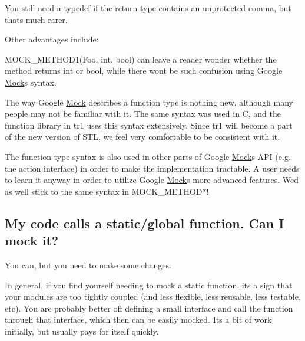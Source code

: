 You still need a {\ttfamily typedef} if the return type contains an unprotected comma, but that\textquotesingle{}s much rarer.

Other advantages include\+:
\begin{DoxyEnumerate}
\item {\ttfamily M\+O\+C\+K\+\_\+\+M\+E\+T\+H\+O\+D1(\+Foo, int, bool)} can leave a reader wonder whether the method returns {\ttfamily int} or {\ttfamily bool}, while there won\textquotesingle{}t be such confusion using Google \hyperlink{class_mock}{Mock}\textquotesingle{}s syntax.
\end{DoxyEnumerate}
\begin{DoxyEnumerate}
\item The way Google \hyperlink{class_mock}{Mock} describes a function type is nothing new, although many people may not be familiar with it. The same syntax was used in C, and the {\ttfamily function} library in {\ttfamily tr1} uses this syntax extensively. Since {\ttfamily tr1} will become a part of the new version of S\+TL, we feel very comfortable to be consistent with it.
\end{DoxyEnumerate}
\begin{DoxyEnumerate}
\item The function type syntax is also used in other parts of Google \hyperlink{class_mock}{Mock}\textquotesingle{}s A\+PI (e.\+g. the action interface) in order to make the implementation tractable. A user needs to learn it anyway in order to utilize Google \hyperlink{class_mock}{Mock}\textquotesingle{}s more advanced features. We\textquotesingle{}d as well stick to the same syntax in {\ttfamily M\+O\+C\+K\+\_\+\+M\+E\+T\+H\+O\+D$\ast$}!
\end{DoxyEnumerate}

\subsection*{My code calls a static/global function. Can I mock it?}

You can, but you need to make some changes.

In general, if you find yourself needing to mock a static function, it\textquotesingle{}s a sign that your modules are too tightly coupled (and less flexible, less reusable, less testable, etc). You are probably better off defining a small interface and call the function through that interface, which then can be easily mocked. It\textquotesingle{}s a bit of work initially, but usually pays for itself quickly.

